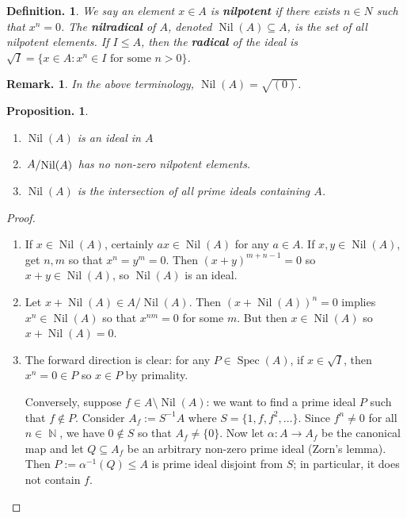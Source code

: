 \documentclass[11pt, a4paper]{memoir}
\DeclareMathOperator{\N}{{\mathbb{N}}}
\theoremstyle{change}
\newtheorem{proposition}[theorem]{Proposition.}
\theoremstyle{plain}
\theoremstyle{nonumberplain}
\newtheorem{definition}{Definition.}
\newtheorem{remark}{Remark.}
\newtheorem{proof}{Proof}
\DeclareMathOperator{\Nil}{Nil}
\DeclareMathOperator{\Spec}{Spec}
\newcommand{\quot}[2]{\mathchoice{\left.\raisebox{0.10em}{$#1$}\middle/\raisebox{-0.10em}{$#2$}\right.}
                                 {\left.\raisebox{0.04em}{$#1$}\middle/\raisebox{-0.04em}{$#2$}\right.}
                                 {\left.\raisebox{0.01em}{$#1$}\middle/\raisebox{-0.01em}{$#2$}\right.}
                                 {\left.\raisebox{0em}{$#1$}\middle/\raisebox{0em}{$#2$}\right.}}
\numberwithin{equation}{section}
\begin{document}
\begin{definition}
    We say an element $x\in A$ is \textbf{nilpotent} if there exists $n\in N$ such that $x^n=0$.
    The \textbf{nilradical} of $A$, denoted $\Nil(A)\subseteq A$, is the set of all nilpotent elements.
    If $I\leq A$, then the \textbf{radical} of the ideal is $\sqrt{I}=\{x\in A:x^n\in I\text{ for some }n>0\}$.
\end{definition}
\begin{remark}
    In the above terminology, $\Nil(A)=\sqrt{(0)}$.
\end{remark}
\begin{proposition}
    \begin{enumerate}[nl,r]
        \item $\Nil(A)$ is an ideal in $A$
        \item $\quot{A}{\Nil(A)}$ has no non-zero nilpotent elements.
        \item $\Nil(A)$ is the intersection of all prime ideals containing $A$.
    \end{enumerate}
\end{proposition}
\begin{proof}
    \begin{enumerate}[nl,r]
        \item If $x\in \Nil(A)$, certainly $ax\in\Nil(A)$ for any $a\in A$.
            If $x,y\in\Nil(A)$, get $n,m$ so that $x^n=y^m=0$.
            Then $(x+y)^{m+n-1}=0$ so $x+y\in\Nil(A)$, so $\Nil(A)$ is an ideal.

        \item Let $x+\Nil(A)\in A/\Nil(A)$.
            Then $\left(x+\Nil(A)\right)^n=0$ implies $x^n\in\Nil(A)$ so that $x^{nm}=0$ for some $m$.
            But then $x\in\Nil(A)$ so $x+\Nil(A)=0$.
        \item The forward direction is clear: for any $P\in\Spec(A)$, if $x\in\sqrt{I}$, then $x^n=0\in P$ so $x\in P$ by primality.

            Conversely, suppose $f\in A\setminus\Nil(A)$: we want to find a prime ideal $P$ such that $f\notin P$.
            Consider $A_f:= S^{-1}A$ where $S=\{1,f,f^2,\ldots\}$.
            Since $f^n\neq 0$ for all $n\in\N$, we have $0\notin S$ so that $A_f\neq\{0\}$.
            Now let $\alpha:A\to A_f$ be the canonical map and let $Q\subseteq A_f$ be an arbitrary non-zero prime ideal (Zorn's lemma).
            Then $P:=\alpha^{-1}(Q)\leq A$ is prime ideal disjoint from $S$; in particular, it does not contain $f$.
    \end{enumerate}
\end{proof}
\end{document}
